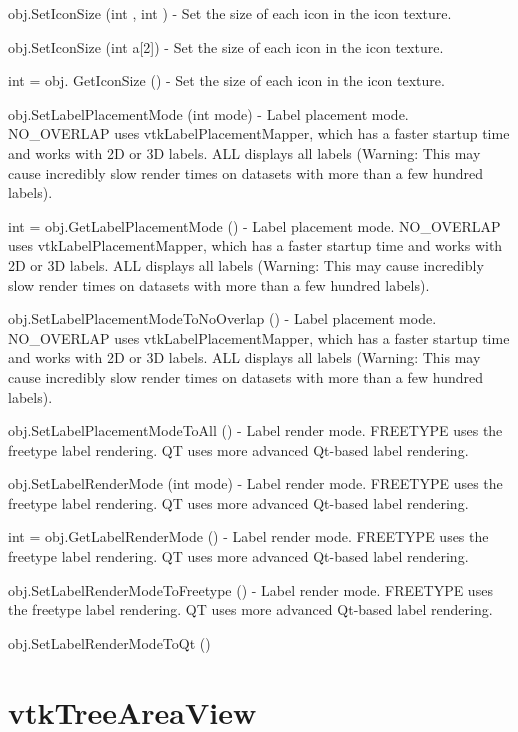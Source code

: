 \begin{DoxyItemize}
\item {\ttfamily obj.\-Set\-Icon\-Size (int , int )} -\/ Set the size of each icon in the icon texture.  
\item {\ttfamily obj.\-Set\-Icon\-Size (int a\mbox{[}2\mbox{]})} -\/ Set the size of each icon in the icon texture.  
\item {\ttfamily int = obj. Get\-Icon\-Size ()} -\/ Set the size of each icon in the icon texture.  
\item {\ttfamily obj.\-Set\-Label\-Placement\-Mode (int mode)} -\/ Label placement mode. N\-O\-\_\-\-O\-V\-E\-R\-L\-A\-P uses vtk\-Label\-Placement\-Mapper, which has a faster startup time and works with 2\-D or 3\-D labels. A\-L\-L displays all labels (Warning\-: This may cause incredibly slow render times on datasets with more than a few hundred labels).  
\item {\ttfamily int = obj.\-Get\-Label\-Placement\-Mode ()} -\/ Label placement mode. N\-O\-\_\-\-O\-V\-E\-R\-L\-A\-P uses vtk\-Label\-Placement\-Mapper, which has a faster startup time and works with 2\-D or 3\-D labels. A\-L\-L displays all labels (Warning\-: This may cause incredibly slow render times on datasets with more than a few hundred labels).  
\item {\ttfamily obj.\-Set\-Label\-Placement\-Mode\-To\-No\-Overlap ()} -\/ Label placement mode. N\-O\-\_\-\-O\-V\-E\-R\-L\-A\-P uses vtk\-Label\-Placement\-Mapper, which has a faster startup time and works with 2\-D or 3\-D labels. A\-L\-L displays all labels (Warning\-: This may cause incredibly slow render times on datasets with more than a few hundred labels).  
\item {\ttfamily obj.\-Set\-Label\-Placement\-Mode\-To\-All ()} -\/ Label render mode. F\-R\-E\-E\-T\-Y\-P\-E uses the freetype label rendering. Q\-T uses more advanced Qt-\/based label rendering.  
\item {\ttfamily obj.\-Set\-Label\-Render\-Mode (int mode)} -\/ Label render mode. F\-R\-E\-E\-T\-Y\-P\-E uses the freetype label rendering. Q\-T uses more advanced Qt-\/based label rendering.  
\item {\ttfamily int = obj.\-Get\-Label\-Render\-Mode ()} -\/ Label render mode. F\-R\-E\-E\-T\-Y\-P\-E uses the freetype label rendering. Q\-T uses more advanced Qt-\/based label rendering.  
\item {\ttfamily obj.\-Set\-Label\-Render\-Mode\-To\-Freetype ()} -\/ Label render mode. F\-R\-E\-E\-T\-Y\-P\-E uses the freetype label rendering. Q\-T uses more advanced Qt-\/based label rendering.  
\item {\ttfamily obj.\-Set\-Label\-Render\-Mode\-To\-Qt ()}  
\end{DoxyItemize}\hypertarget{vtkviews_vtktreeareaview}{}\section{vtk\-Tree\-Area\-View}\label{vtkviews_vtktreeareaview}
